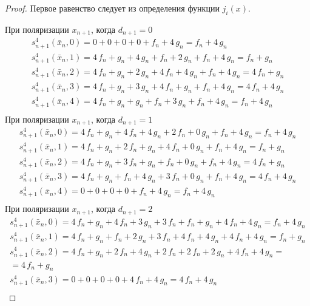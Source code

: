 \documentclass[bibliography=totoc, a4paper, 14pt]{extarticle}
\begin{document}
 \begin{proof}

Первое равенство следует из определения функции $j_i(x)$.

При поляризации $x_{n+1}$, когда $d_{n+1} = 0$
$$\begin{array}{l}
s_{n+1}^4(\bar{x}_n, 0) = 0 + 0 + 0 + 0 + f_n + 4\,g_n = f_n + 4\,g_n \\
s_{n+1}^4(\bar{x}_n, 1) = 4\,f_n + g_n + 4\,g_n + f_n + 2\,g_n + f_n + 4\,g_n = f_n + g_n \\
s_{n+1}^4(\bar{x}_n, 2) = 4\,f_n + g_n + 2\,g_n + 4\,f_n + 4\,g_n + f_n + 4\,g_n = 4\,f_n + g_n \\
s_{n+1}^4(\bar{x}_n, 3) = 4\,f_n + g_n + 3\,g_n + 4\,f_n + g_n + f_n + 4\,g_n = 4\,f_n + 4\,g_n \\
s_{n+1}^4(\bar{x}_n, 4) = 4\,f_n + g_n + g_n + f_n + 3\,g_n + f_n + 4\,g_n = f_n + 4\,g_n \\
\end{array}$$
При поляризации $x_{n+1}$, когда $d_{n+1} = 1$
$$\begin{array}{l}
s_{n+1}^4(\bar{x}_n, 0) = 4\,f_n + g_n + 4\,f_n + 4\,g_n + 2\,f_n + 0\,g_n + f_n + 4\,g_n = f_n + 4\,g_n \\
s_{n+1}^4(\bar{x}_n, 1) = 4\,f_n + g_n + 2\,f_n + g_n + 4\,f_n + 0\,g_n + f_n + 4\,g_n = f_n + g_n \\
s_{n+1}^4(\bar{x}_n, 2) = 4\,f_n + g_n + 3\,f_n + g_n + f_n + 0\,g_n + f_n + 4\,g_n = 4\,f_n + g_n \\
s_{n+1}^4(\bar{x}_n, 3) = 4\,f_n + g_n + f_n + 4\,g_n + 3\,f_n + 0\,g_n + f_n + 4\,g_n = 4\,f_n + 4\,g_n \\
s_{n+1}^4(\bar{x}_n, 4) = 0 + 0 + 0 + 0 + f_n + 4\,g_n = f_n + 4\,g_n \\
\end{array}$$
При поляризации $x_{n+1}$, когда $d_{n+1} = 2$
$$\begin{array}{l}
s_{n+1}^4(\bar{x}_n, 0) = 4\,f_n + g_n + 4\,f_n + 3\,g_n + 3\,f_n + f_n + g_n + 4\,f_n + 4\,g_n = f_n + 4\,g_n \\
s_{n+1}^4(\bar{x}_n, 1) = 4\,f_n + g_n + f_n + 2\,g_n + 3\,f_n + 4\,f_n + 4\,g_n + 4\,f_n + 4\,g_n = f_n + g_n \\
s_{n+1}^4(\bar{x}_n, 2) = 4\,f_n + g_n + 2\,f_n + 4\,g_n + 2\,f_n + 2\,f_n + 2\,g_n + 4\,f_n + 4\,g_n =\\
= 4\,f_n + g_n \\
s_{n+1}^4(\bar{x}_n, 3) = 0 + 0 + 0 + 0 + 4\,f_n + 4\,g_n = 4\,f_n + 4\,g_n \\

\end{array}$$
\end{proof}
\end{document}
